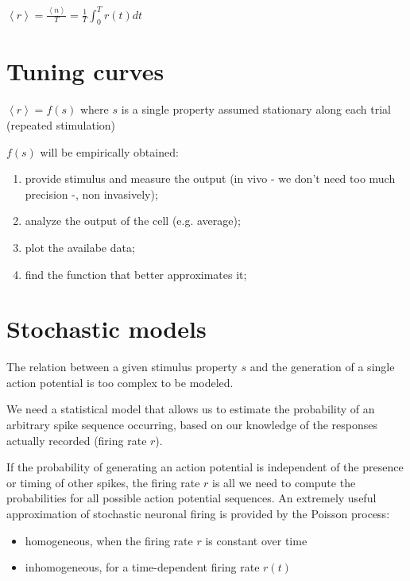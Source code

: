 \documentclass[12pt]{article}
\begin{document}
\begin{center}
	$\left \langle r \right \rangle = \frac{\left \langle n \right \rangle}{T} = \frac{1}{T}\int_{0}^{T}r(t) dt$
\end{center}

\section{Tuning curves}

\begin{center}
	$\left \langle r \right \rangle = f(s)$
	where $s$ is a single property assumed stationary along each trial (repeated stimulation)
\end{center}

$f(s)$ will be empirically obtained:

\begin{enumerate}
	\item provide stimulus and measure the output (in vivo - we don't need too much precision -, non invasively);
	\item analyze the output of the cell (e.g. average);
	\item plot the availabe data;
	\item find the function that better approximates it;
\end{enumerate}

\section{Stochastic models}

The relation between a given stimulus property $s$ and the generation of a single action potential is too complex to be modeled. 

We need a statistical model that allows us to estimate the probability of an arbitrary spike sequence occurring, based on our knowledge of the responses actually recorded (firing rate $r$).

If the probability of generating an action potential is independent of the presence or timing of other spikes, the firing rate $r$ is all we need to compute the probabilities for all possible action potential sequences. An extremely useful approximation of stochastic neuronal firing is provided by the Poisson process:

\begin{itemize}
	\item homogeneous, when the firing rate $r$ is constant over time
	\item inhomogeneous, for a time-dependent firing rate $r(t)$
\end{itemize}
\end{document}
